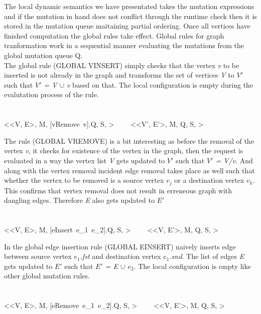 \smallskip

The local dynamic semantics we have presentated takes the mutation expressions and if the mutation in hand does not conflict through the runtime check then it is stored in the mutation queue maitaining partial ordering. Once all vertices have finished computation the global rules take effect. Global rules for graph tranformation work in a sequential manner evaluating the mutations from the global mutation queue Q.\\
The global rule (GLOBAL VINSERT) simply checks that the vertex \emph{v} to be inserted is not already in the graph and transforms the set of vertices \emph{V} to \emph{$V'$} such that \emph{$V'$ = V $\cup$ v} based on that. The local configuration is empty during the evalutation process of the rule.\\
\\
\\
{<<V, E>, M, [vRemove\ v].Q, S, \bullet > \ \ \reducesto \ \ <<V', E'>, M, Q, S, \bullet >}

\smallskip
The rule (GLOBAL VREMOVE) is a bit interesting as before the removal of the vertex \emph{v}, it checks for existence of the vertex in the graph, then the request is evaluated in a way the vertex list \emph{V} gets updated to \emph{$V'$} such that \emph{$V'$ = V/v}. And along with the vertex removal incident edge removal takes place as well such that whether the vertex to be removed is a source vertex $v_j$ or a destination vertex $v_k$. This confirms that vertex removal does not result in erreneous graph with dangling edges. Therefore \emph{E} also gets updated to \emph{$E'$}\\
\ \\
\ \\
{<<V, E>, M, [eInsert\ e_1~e_2].Q, S, \bullet > \ \ \reducesto \ \ <<V, E'>, M, Q, S, \bullet >}

\smallskip
In the global edge insertion rule (GLOBAL EINSERT) naively inserts edge between source vertex \emph{$e_1$.fst} and destination vertex \emph{$e_1$.snd}. The list of edges \emph{E} gets updated to \emph{$E'$} such that \emph{$E'$ = E $\cup$ $e_2$}. The local configuration is empty like other global mutation rules.\\
\ \\
\ \\
{<<V, E>, M, [eRemove\ e_1~e_2].Q, S, \bullet > \ \ \reducesto \ \ <<V, E'>, M, Q, S, \bullet >}

